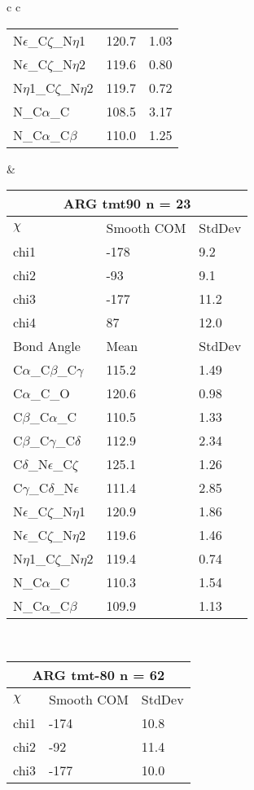 \begin{longtable}{ c c }
\begin{tabular}{ l l l }
  N$\epsilon$\_C$\zeta$\_N$\eta$1 & 120.7 & 1.03\\
  N$\epsilon$\_C$\zeta$\_N$\eta$2 & 119.6 & 0.80\\
  N$\eta$1\_C$\zeta$\_N$\eta$2 & 119.7 & 0.72\\
  N\_C$\alpha$\_C & 108.5 & 3.17\\
  N\_C$\alpha$\_C$\beta$ & 110.0 & 1.25\\
  \bottomrule
  \end{tabular}
  &
  \begin{tabular}{ l l l }
  \toprule
  \multicolumn{3}{c}{ARG \textbf{tmt90} n = 23} \\ \toprule
  $\chi$       & Smooth COM & StdDev \\ \midrule
  chi1 & -178 & 9.2 \\ 
  chi2 & -93 & 9.1 \\ 
  chi3 & -177 & 11.2 \\ 
  chi4 & 87 & 12.0 \\ \midrule
  Bond Angle   & Mean     & StdDev \\ \midrule
  C$\alpha$\_C$\beta$\_C$\gamma$ & 115.2 & 1.49\\
  C$\alpha$\_C\_O & 120.6 & 0.98\\
  C$\beta$\_C$\alpha$\_C & 110.5 & 1.33\\
  C$\beta$\_C$\gamma$\_C$\delta$ & 112.9 & 2.34\\
  C$\delta$\_N$\epsilon$\_C$\zeta$ & 125.1 & 1.26\\
  C$\gamma$\_C$\delta$\_N$\epsilon$ & 111.4 & 2.85\\
  N$\epsilon$\_C$\zeta$\_N$\eta$1 & 120.9 & 1.86\\
  N$\epsilon$\_C$\zeta$\_N$\eta$2 & 119.6 & 1.46\\
  N$\eta$1\_C$\zeta$\_N$\eta$2 & 119.4 & 0.74\\
  N\_C$\alpha$\_C & 110.3 & 1.54\\
  N\_C$\alpha$\_C$\beta$ & 109.9 & 1.13\\
  \bottomrule
  \end{tabular}
  \\
  \begin{tabular}{ l l l }
  \toprule
  \multicolumn{3}{c}{ARG \textbf{tmt-80} n = 62} \\ \toprule
  $\chi$       & Smooth COM & StdDev \\ \midrule
  chi1 & -174 & 10.8 \\ 
  chi2 & -92 & 11.4 \\ 
  chi3 & -177 & 10.0 \\ 

\end{tabular}
\end{longtable}
